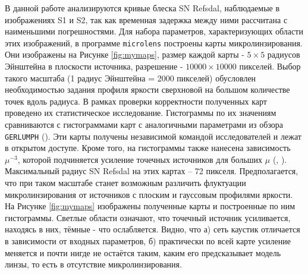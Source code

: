 В данной работе анализируются кривые блеска SN Refsdal, наблюдаемые в изображениях S1 и S2, так как временная задержка между ними рассчитана с наименьшими погрешностями. Для набора параметров, характеризующих области этих изображений, в программе \texttt{microlens} построены карты микролинзирования. Они изображены на Рисунке \ref{fig:mymaps}, размер каждой карты - $5\times5$ радиусов Эйнштейна в плоскости источника, разрешение - $10000\times10000$ пикселей. Выбор такого масштаба (1 радиус Эйнштейна = 2000 пикселей) обусловлен необходимостью задания профиля яркости сверхновой на большом количестве точек вдоль радиуса. В рамках проверки корректности полученных карт проведено их статистическое исследование. Гистограммы по их значениям сравниваются с гистограммами карт с аналогичными параметрами из обзора \texttt{GERLUMPH} (\cite{gerlumph}). Эти карты получены независимой командой исследователей и лежат в открытом доступе. Кроме того, на гистограммы также нанесена зависимость $\mu^{-3}$, которой подчиняется усиление точечных источников для больших $\mu$ (\cite{wambsganss1992-probabilities}, \cite{blandfordnarayan1986}). Максимальный радиус SN Refsdal на этих картах – 72 пикселя. Предполагается, что при таком масштабе станет возможным различить флуктуации микролинзирования от источников с плоским и гауссовым профилями яркости. На Рисунке \ref{fig:mymaps} изображены полученные карты и построенные по ним гистограммы. Светлые области означают, что точечный источник усиливается, находясь в них, тёмные - что ослабляется. Видно, что а) сеть каустик отличается в зависимости от входных параметров, б) практически по всей карте усиление меняется и почти нигде не остаётся таким, каким его предсказывает модель линзы, то есть в отсутствие микролинзирования.

